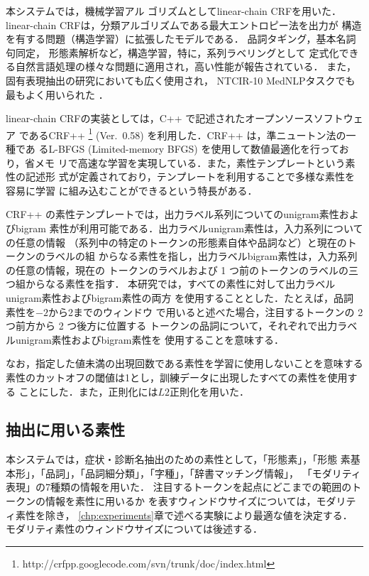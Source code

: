 \documentclass[japanese]{jnlp_1.4}
\begin{document}
本システムでは，機械学習アル
ゴリズムとしてlinear-chain CRFを用いた．
linear-chain CRFは，分類アルゴリズムである最大エントロピー法を出力が
構造を有する問題（構造学習）に拡張したモデルである．
品詞タギング\cite{lafferty2001conditional}，基本名詞句同定\cite{sha2003shallow}，
形態素解析\cite{kudo2004applying}など，構造学習，特に，系列ラベリングとして
定式化できる自然言語処理の様々な問題に適用され，高い性能が報告されている．
また，固有表現抽出の研究においても広く使用され\cite{mccallum2003early,jiang2011study}，
NTCIR-10 MedNLPタスクでも最もよく用いられた
\cite{imaichi2013comparison,laquerre2013necla,miura2013incorporating}．

linear-chain CRFの実装としては，C++ で記述されたオープンソースソフトウェア
であるCRF++ 
\footnote{http://crfpp.googlecode.com/svn/trunk/doc/index.html} (Ver.~0.58) を利用した．CRF++ は，準ニュートン法の一種であ
るL-BFGS (Limited-memory BFGS) を使用して数値最適化を行っており，省メモ
リで高速な学習を実現している．また，素性テンプレートという素性の記述形
式が定義されており，テンプレートを利用することで多様な素性を容易に学習
に組み込むことができるという特長がある．

CRF++ の素性テンプレートでは，出力ラベル系列についてのunigram素性およびbigram
素性が利用可能である．出力ラベルunigram素性は，入力系列についての任意の情報
（系列中の特定のトークンの形態素自体や品詞など）と現在のトークンのラベルの組
からなる素性を指し，出力ラベルbigram素性は，入力系列の任意の情報，現在の
トークンのラベルおよび 1 つ前のトークンのラベルの三つ組からなる素性を指す．
本研究では，すべての素性に対して出力ラベルunigram素性およびbigram素性の両方
を使用することとした．たとえば，品詞素性を$-2$から2までのウィンドウ
で用いると述べた場合，注目するトークンの 2 つ前方から 2 つ後方に位置する
トークンの品詞について，それぞれで出力ラベルunigram素性およびbigram素性を
使用することを意味する．

なお，指定した値未満の出現回数である素性を学習に使用しないことを意味する
素性のカットオフの閾値は1とし，訓練データに出現したすべての素性を使用する
ことにした．また，正則化には$L2$正則化を用いた．


\subsection{抽出に用いる素性}
\label{sec:features}

本システムでは，症状・診断名抽出のための素性として，「形態素」，「形態
素基本形」，「品詞」，「品詞細分類」，「字種」，「辞書マッチング情報」，
「モダリティ表現」の7種類の情報を用いた．
注目するトークンを起点にどこまでの範囲のトークンの情報を素性に用いるか
を表すウィンドウサイズについては，モダリティ素性を除き，
\ref{chp:experiments}章で述べる実験により最適な値を決定する．
モダリティ素性のウィンドウサイズについては後述する．
\end{document}
